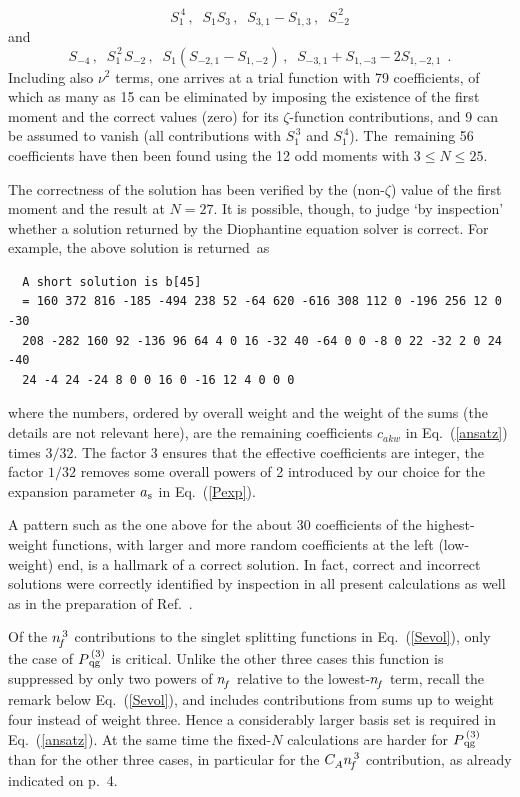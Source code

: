 \documentclass[12pt]{article}
\newcommand{\beq}{\begin{equation}}
\newcommand{\eeq}{\end{equation}}
\begin{document}
\pagebreak

\vspace*{-1cm}
\beq
  S_1^{\,4} \, , \;\; S_1 S_3 \, , \;\;
  S_{3,1} - S_{1,3} \, , \;\; S_{-2}^{\,2}
\eeq
and
\beq
  S_{-4}\, , \;\; S_1^{\,2\,} S_{-2} \, , \;\;
  S_1 (S_{-2,1} - S_{1,-2}) \, , \;\; S_{-3,1} + S_{1,-3} -2 S_{1,-2,1} 
\:\: .
\eeq
%
Including also $\nu^2$ terms, one arrives at a trial function with 79
coefficients, of which as many as 15 can be eliminated by imposing the 
existence of the first moment and the correct values (zero) for its
$\zeta$-function contributions, and 9 can be assumed to vanish 
(all contributions with $S_1^{\,3}$ and $S_1^{\,4}$).
The~remaining 56 coefficients have then been found using the 12 odd moments 
with $3 \leq N \leq 25$.

The correctness of the solution has been verified by the (non-$\zeta$) value
of the first moment and the result at $N=27$. It is possible, though,
to judge `by inspection' whether a solution returned by the Diophantine
equation solver \cite{axbAlg,Calc} is correct. For example, the above solution
is returned~as

\vspace*{-3mm}
\begin{verbatim} 
  A short solution is b[45]
  = 160 372 816 -185 -494 238 52 -64 620 -616 308 112 0 -196 256 12 0 -30 
  208 -282 160 92 -136 96 64 4 0 16 -32 40 -64 0 0 -8 0 22 -32 2 0 24 -40 
  24 -4 24 -24 8 0 0 16 0 -16 12 4 0 0 0
\end{verbatim}

\vspace*{-3mm}
\noindent
where the numbers, ordered by overall weight and the weight of the sums
(the details are not relevant here), are the remaining coefficients $c_{akw}$
in Eq.~(\ref{ansatz}) times $3/32$. 
The factor 3 ensures that the effective coefficients are integer, the factor 
$1/32$ removes some overall powers of 2 introduced by our choice for the 
expansion parameter $a_{\rm s}$ in Eq.~(\ref{Pexp}).

A pattern such as the one above for the about 30 coefficients of the 
highest-weight functions, with larger and more random coefficients at the
left (low-weight) end, is a hallmark of a correct solution. In fact, correct 
and incorrect solutions were correctly identified by inspection in all present
calculations as well as in the preparation of Ref.~\cite{mvvDP2}.
 
Of the ${n^{\,3}_{\! f}}$ contributions to the singlet splitting functions in 
Eq.~(\ref{Sevol}), only the case of $P_{\,\rm qg}^{\,(3)}$ is critical.
Unlike the other three cases this function is suppressed by only two powers
of ${n^{}_{\! f}}$ relative to the lowest-${n^{}_{\! f}}$ term, recall the remark below 
Eq.~(\ref{Sevol}), and includes contributions from sums up to weight four
instead of weight three. Hence a considerably larger basis set is required
in Eq.~(\ref{ansatz}). At the same time the fixed-$N$ calculations are 
harder for $P_{\,\rm qg}^{\,(3)}$ than for the other three cases, in 
particular for the ${C^{}_A} {n^{\,3}_{\! f}}$ contribution, as already indicated on p.~4.
  
\end{document}
